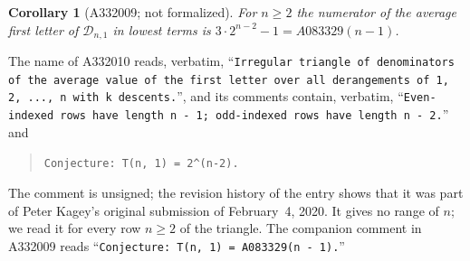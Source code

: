 \documentclass[11pt]{amsart}
\theoremstyle{plain}
\newtheorem{corollary}[theorem]{Corollary}
\theoremstyle{definition}
\newcommand{\cD}{\mathcal{D}}
\begin{document}
\begin{corollary}[A332009; not formalized]\label{cor:num}
For $n\ge2$ the numerator of the average first letter of $\cD_{n,1}$ in lowest terms is $3\cdot2^{n-2}-1=A083329(n-1)$.
\end{corollary}

The name of A332010 \cite{A332010} reads, verbatim, ``\texttt{Irregular triangle of denominators of the average value of the first letter over all derangements of {}1, 2, ..., n{} with k descents.}'', and its comments contain, verbatim, ``\texttt{Even-indexed rows have length n - 1; odd-indexed rows have length n - 2.}'' and
\begin{quote}
\texttt{Conjecture: T(n, 1) = 2\^{}(n-2).}
\end{quote}
The comment is unsigned; the revision history of the entry shows that it was part of Peter Kagey's original submission of February~4, 2020. It gives no range of $n$; we read it for every row $n\ge2$ of the triangle. The companion comment in A332009 reads ``\texttt{Conjecture: T(n, 1) = A083329(n - 1).}''
\end{document}
